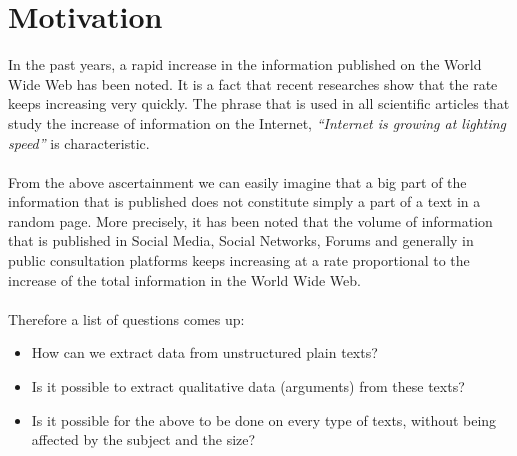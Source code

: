 \section{Motivation}
In the past years, a rapid increase in the information published on the World Wide Web has been noted. It is a fact that recent researches show that the rate keeps increasing very quickly. The phrase that is used in all scientific articles that study the increase of information on the Internet, \textit{``Internet is growing at lighting speed''} is characteristic.\\
\\
From the above ascertainment we can easily imagine that a big part of the information that is published does not constitute simply a part of a text in a random page. More precisely, it has been noted that the volume of information that is published in Social Media, Social Networks, Forums and generally in public consultation platforms keeps increasing at a rate proportional to  the increase of the total information in the World Wide Web.\\
\\
Therefore a list of questions comes up:\\

\begin{itemize}

	\item How can we extract data from unstructured plain texts?
	\item Is it possible to extract qualitative data (arguments) from these texts?
	\item Is it possible for the above to be done on every type of texts, without being affected by the subject and the size?\\

\end{itemize}

